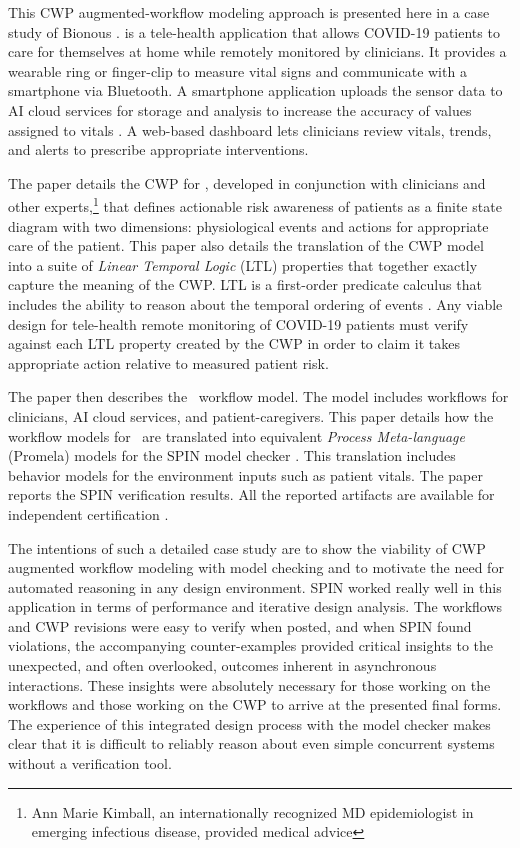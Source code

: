 This CWP augmented-workflow modeling approach is presented here in a case study of Bionous \phware. \phware is a tele-health application that allows COVID-19 patients to care for themselves at home while remotely monitored by clinicians. It provides a wearable ring or finger-clip to measure vital signs and communicate with a smartphone via Bluetooth. A smartphone application uploads the sensor data to AI cloud services for storage and analysis to increase the accuracy of values assigned to vitals \cite{Altschul2004PredictiveMI,10.2307/2984877,10.5555/1643031.1643047}. A web-based dashboard lets clinicians review vitals, trends, and alerts to prescribe appropriate interventions. 

The paper details the CWP for \phware, developed in conjunction with clinicians and other experts,\footnote{Ann Marie Kimball, an internationally recognized MD epidemiologist in emerging infectious disease, provided medical advice} that defines actionable risk awareness of patients as a finite state diagram with two dimensions: physiological events and actions for appropriate care of the patient. This paper also details the translation of the CWP model into a suite of \emph{Linear Temporal Logic} (LTL) properties that together exactly capture the meaning of the CWP. LTL is a first-order predicate calculus that includes the ability to reason about the temporal ordering of events \cite{10.5555/975331}. Any viable design for tele-health remote monitoring of COVID-19 patients must verify against each LTL property created by the CWP in order to claim it takes appropriate action relative to measured patient risk.

The paper then describes the \phware\ workflow model. The model includes workflows for clinicians, AI cloud services, and patient-caregivers. This paper details how the workflow models for \phware\ are translated into equivalent \emph{Process Meta-language} (Promela) models for the SPIN model checker \cite{spin}. This translation includes behavior models for the environment inputs such as patient vitals. The paper reports the SPIN verification results. All the reported artifacts are available for independent certification \cite{repo}.

The intentions of such a detailed case study are to show the viability of CWP augmented workflow modeling with model checking and to motivate the need for automated reasoning in any design environment. SPIN worked really well in this application in terms of performance and iterative design analysis. The workflows and CWP revisions were easy to verify when posted, and when SPIN found violations, the accompanying counter-examples provided critical insights to the unexpected, and often overlooked, outcomes inherent in asynchronous interactions. These insights were absolutely necessary for those working on the workflows and those working on the CWP to arrive at the presented final forms. The experience of this integrated design process with the model checker makes clear that it is difficult to reliably reason about even simple concurrent systems without a verification tool.